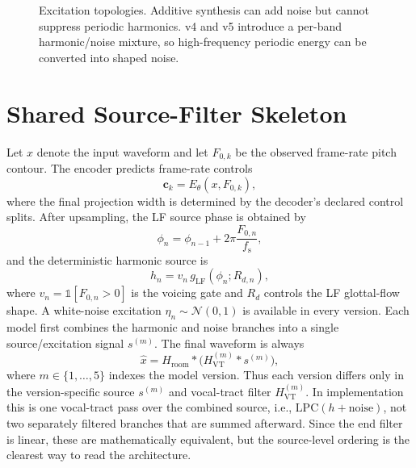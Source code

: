 \documentclass[11pt]{article}
\newcommand{\fs}{f_{\mathrm{s}}}
\newcommand{\src}{s}
\newcommand{\harm}{h}
\newcommand{\noise}{\eta}
\newcommand{\vt}{H_{\mathrm{VT}}}
\newcommand{\room}{H_{\mathrm{room}}}
\newcommand{\lf}{g_{\mathrm{LF}}}
\begin{document}
\begin{figure}[ht]
{}
\caption{Excitation topologies. Additive synthesis can add noise but cannot
suppress periodic harmonics. v4 and v5 introduce a per-band harmonic/noise
mixture, so high-frequency periodic energy can be converted into shaped noise.}
\label{fig:excitation-topologies}
\end{figure}

\section{Shared Source-Filter Skeleton}

Let $x$ denote the input waveform and let $F_{0,k}$ be the observed frame-rate
pitch contour. The encoder predicts frame-rate controls
\begin{equation}
  \mathbf{c}_k = E_\theta(x, F_{0,k}),
\end{equation}
where the final projection width is determined by the decoder's declared
control splits. After upsampling, the LF source phase is obtained by
\begin{equation}
  \phi_n = \phi_{n-1} + 2\pi \frac{F_{0,n}}{\fs},
\end{equation}
and the deterministic harmonic source is
\begin{equation}
  \harm_n = v_n \, \lf(\phi_n; R_{d,n}),
\end{equation}
where $v_n=\mathbb{1}[F_{0,n}>0]$ is the voicing gate and $R_d$ controls the
LF glottal-flow shape. A white-noise excitation $\noise_n\sim\mathcal{N}(0,1)$
is available in every version. Each model first combines the harmonic and
noise branches into a single source/excitation signal $\src^{(m)}$. The final
waveform is always
\begin{equation}
  \hat{x} = \room * \bigl(\vt^{(m)} * \src^{(m)}\bigr),
\end{equation}
where $m\in\{1,\ldots,5\}$ indexes the model version. Thus each version differs
only in the version-specific source $\src^{(m)}$ and vocal-tract filter
$\vt^{(m)}$. In implementation this is one vocal-tract pass over the combined
source, i.e., $\mathrm{LPC}(\harm+\mathrm{noise})$, not two separately filtered
branches that are summed afterward. Since the end filter is linear, these are
mathematically equivalent, but the source-level ordering is the clearest way
to read the architecture.
\end{document}
